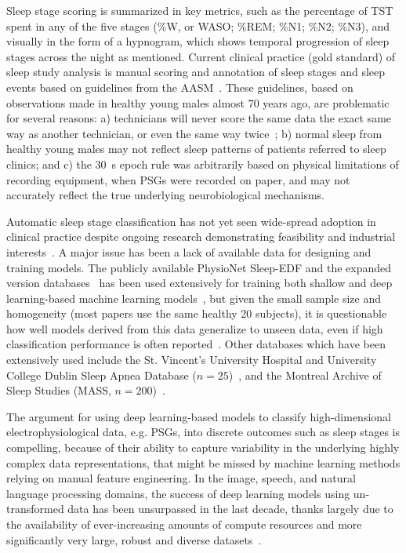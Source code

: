 Sleep stage scoring is summarized in key metrics, such as the percentage of \ac{TST} spent in any of the five stages (\%\ac{W}, or \ac{WASO}; \%\ac{REM}; \%\ac{N1}; \%\ac{N2}; \%\ac{N3}), and visually in the form of a hypnogram, which shows temporal progression of sleep stages across the night as mentioned. 
Current clinical practice (gold standard) of sleep study analysis is manual scoring and annotation of sleep stages and sleep events based on guidelines from the \ac{AASM}~\cite{Berry2018}. 
These guidelines, based on observations made in healthy young males almost 70 years ago, are problematic for several reasons: a) technicians will never score the same data the exact same way as another technician, or even the same way twice~\cite{Norman2000,Rosenberg2013,Younes2016,Younes2017,Younes2018}; b) normal sleep from healthy young males may not reflect sleep patterns of patients referred to sleep clinics; and c) the \SI{30}{\second} epoch rule was arbitrarily based on physical limitations of recording equipment, when \acp{PSG} were recorded on paper, and may not accurately reflect the true underlying neurobiological mechanisms.

Automatic sleep stage classification has not yet seen wide-spread adoption in clinical practice despite ongoing research demonstrating feasibility and industrial interests~\cite{Fiorillo2019}. 
A major issue has been a lack of available data for designing and training models. 
The publicly available PhysioNet Sleep-EDF and the expanded version databases~\cite{Goldberger2000,Kemp2000} has been used extensively for training both shallow and deep learning-based machine learning models~\cite{Vilamala2017,Phan2018,Supratak2017}, but given the small sample size and homogeneity (most papers use the same healthy 20 subjects), it is questionable how well models derived from this data generalize to unseen data, even if high classification performance is often reported~\cite{Fiorillo2019}. 
Other databases which have been extensively used include the St. Vincent’s University Hospital and University College Dublin Sleep Apnea Database (\(n=25\))~\cite{Goldberger2000,Sen2014}, and the Montreal Archive of Sleep Studies (MASS, \(n=200\))~\cite{OReilly2014,Supratak2017,Chambon2018c,Andreotti2018,Phan2019a,Phan2019b}. 

The argument for using deep learning-based models to classify high-dimensional electrophysiological data, e.g. \acp{PSG}, into discrete outcomes such as sleep stages is compelling, because of their ability to capture variability in the underlying highly complex data representations, that might be missed by machine learning methods relying on manual feature engineering.
In the image, speech, and natural language processing domains, the success of deep learning models using un-transformed data has been unsurpassed in the last decade, thanks largely due to the availability of ever-increasing amounts of compute resources and more significantly very large, robust and diverse datasets~\cite{LeCun2015}.


